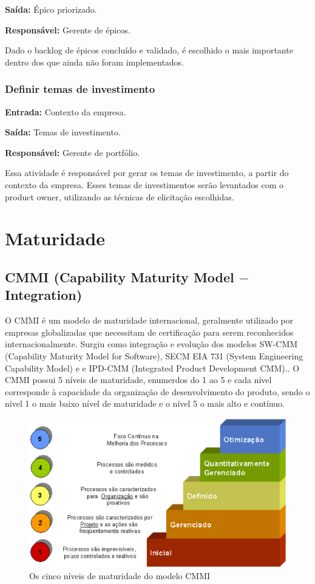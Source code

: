     \textbf{Saída:} Épico priorizado.

    \textbf{Responsável:} Gerente de épicos.
    
    Dado o backlog de épicos concluído e validado, é escolhido o mais importante dentro dos que ainda não foram implementados.

  \subsubsection{Definir temas de investimento}
    \textbf{Entrada:} Contexto da empresa.

    \textbf{Saída:} Temas de investimento.

    \textbf{Responsável:} Gerente de portfólio.
    
    Essa atividade é responsável por gerar os temas de investimento, a partir do contexto da empresa. Esses temas de investimentos serão levantados com o product owner, utilizando as técnicas de elicitação escolhidas.

\section{Maturidade}

\subsection{CMMI (Capability Maturity Model $-$ Integration)}

  O CMMI é um modelo de maturidade internacional, geralmente utilizado por empresas
  globalizadas que necessitam de certificação para serem reconhecidos internacionalmente.
  Surgiu como integração e evolução dos modelos SW-CMM (Capability Maturity Model for Software),
  SECM EIA 731 (System Engineering Capability Model) e  e IPD-CMM
  (Integrated Product Development CMM).\cite{mct2006}.
  O CMMI possui 5 níveis de maturidade, enumerdos do 1 ao 5 e cada nível corresponde
  à capacidade da organização de desenvolvimento do produto, sendo o nível 1 o mais
  baixo nível de maturidade e o nível 5 o mais alto e contínuo.

  \begin{figure}[!ht]
    \centering
    \includegraphics[width=15cm, keepaspectratio=true]{figuras/maturidade/niveis-cmmi.eps}
    \caption{Os cinco níveis de maturidade do modelo CMMI}
  \end{figure}

